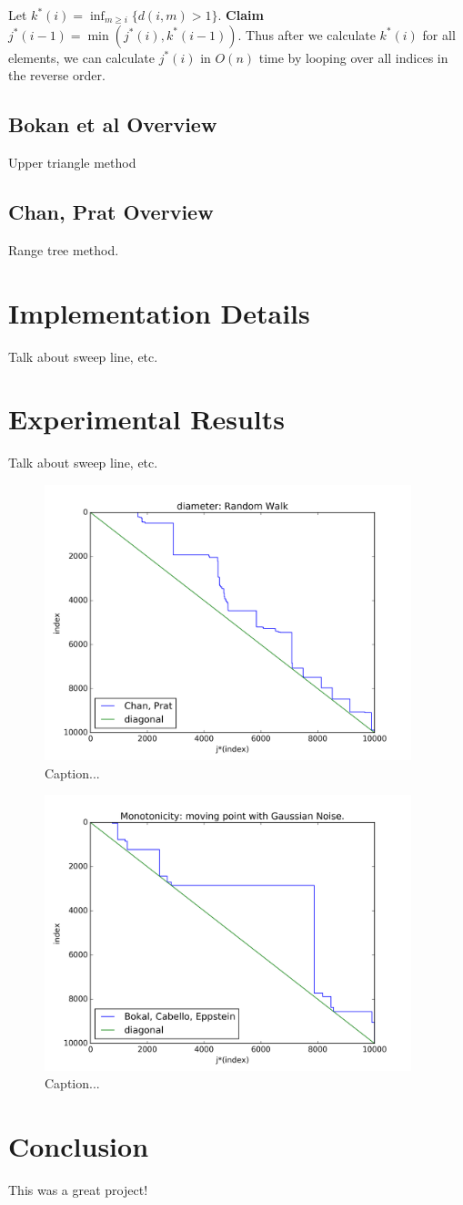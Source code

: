 \documentclass{article}
\begin{document}
Let $k^*(i) = \inf_{m \geq i} \{d(i, m) > 1\}$. \textbf{Claim} $j^*(i-1) = \min(j^*(i), k^*(i-1))$. Thus after we calculate $k^*(i)$ for all elements, we can calculate $j^*(i)$ in $O(n)$ time by looping over all indices in the reverse order.

\subsection{Bokan et al Overview}
Upper triangle method

\subsection{Chan, Prat Overview}
Range tree method.

\section{Implementation Details}
Talk about sweep line, etc.

\section{Experimental Results}
Talk about sweep line, etc.
\begin{figure}[!h]
  \centering
  \includegraphics[height=8cm]{plots/diameter_random_walk}
  \caption{Caption...}
  \label{fig:diameter_demo}
\end{figure}

\begin{figure}[!h]
  \centering
  \includegraphics[height=8cm]{plots/monotonicity_moving_gaussian}
  \caption{Caption...}
  \label{fig:monotonicity_demo}
\end{figure}

\section{Conclusion}
This was a great project!



\end{document}
